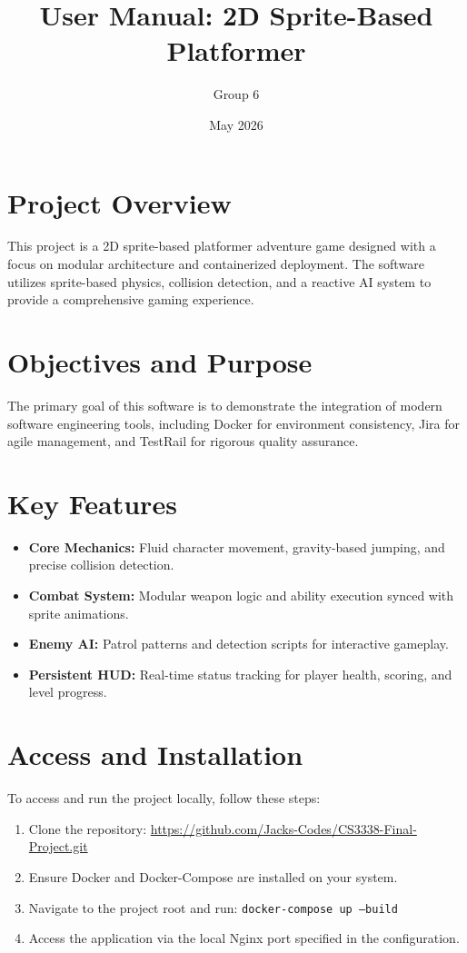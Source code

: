 \documentclass{article}
\title{User Manual: 2D Sprite-Based Platformer}
\author{Group 6}
\date{May 2026}
\begin{document}
\maketitle

\section{Project Overview}
This project is a 2D sprite-based platformer adventure game designed with a focus on modular architecture and containerized deployment. The software utilizes sprite-based physics, collision detection, and a reactive AI system to provide a comprehensive gaming experience.

\section{Objectives and Purpose}
The primary goal of this software is to demonstrate the integration of modern software engineering tools, including Docker for environment consistency, Jira for agile management, and TestRail for rigorous quality assurance. 

\section{Key Features}
\begin{itemize}
    \item \textbf{Core Mechanics:} Fluid character movement, gravity-based jumping, and precise collision detection.
    \item \textbf{Combat System:} Modular weapon logic and ability execution synced with sprite animations.
    \item \textbf{Enemy AI:} Patrol patterns and detection scripts for interactive gameplay.
    \item \textbf{Persistent HUD:} Real-time status tracking for player health, scoring, and level progress.
\end{itemize}

\section{Access and Installation}
To access and run the project locally, follow these steps:
\begin{enumerate}
    \item Clone the repository: \url{https://github.com/Jacks-Codes/CS3338-Final-Project.git}
    \item Ensure Docker and Docker-Compose are installed on your system.
    \item Navigate to the project root and run: \texttt{docker-compose up --build}
    \item Access the application via the local Nginx port specified in the configuration.
\end{enumerate}
\end{document}
